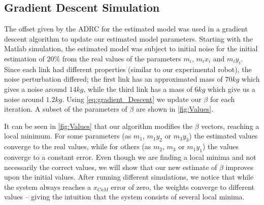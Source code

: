 \documentclass[letterpaper, 10 pt, conference]{ieeeconf}  %
\begin{document}
\subsection{Gradient Descent Simulation}
\label{subsec:sim_results}

The offset given by the \ac{ADRC} for the estimated model was used in a gradient descent algorithm to update our estimated model parameters. Starting with the Matlab simulation, the estimated model was subject to initial noise for the initial estimation of $20\%$ from the real values of the parameters $m_i$, $m_ix_i$ and $m_iy_i$. Since each link had different properties (similar to our experimental robot), the noise perturbation differed; the first link has an approximated mass of $70 kg$  which gives a noise around $14kg$, while the third link has a mass of $6kg$ which give us a noise around $1.2kg$. Using \cref{eq:gradient_Descent} we update our $\beta$ for each iteration. A subset of the parameters of $\beta$ are shown in \cref{fig:Values}.




It can be seen in \cref{fig:Values} that our algorithm modifies the $\beta$ vectors, reaching a local minimum. For some parameters (as $m_1$, $m_1y_2$ or $m_3y_3$) the estimated values converge to the real values, while for others (as $m_2$, $m_3$ or $m_1y_1$) the values converge to a constant error. Even though we are finding a local minima and not necessarily the correct values, we will show that our new estimate of $\beta$ improves upon the initial values. After running different simulations, we notice that while the system always reaches a $x_{CoM}$ error of zero, the weights converge to different values -- giving the intuition that the system consists of several local minima.
\end{document}
